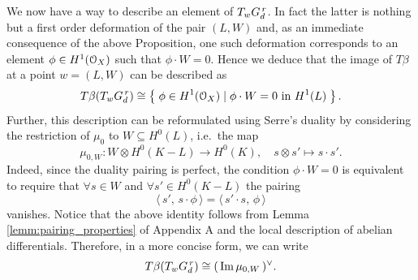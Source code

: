 	We now have a way to describe an element of $T_wG_d^{\,r}$. In fact the latter is nothing but a first order deformation of the pair $(L,W)$ and, as an immediate consequence of the above Proposition, one such deformation corresponds to an element $\phi\in H^1(\mathcal{O}_X)$ such that $\phi\cdot W = 0$. Hence we deduce that the image of $T\beta$ at a point $w=(L,W)$ can be described as
	\begin{equation*}
		T\beta(T_w G_d^{\,r}) \cong \left\{\;  \phi \in H^1(\mathcal{O}_X) \mid \phi\cdot W = 0 \text{ in } H^1(L)  \; \right\}.
	\end{equation*}
	Further, this description can be reformulated using Serre's duality by considering the restriction of $\mu_0$ to $W\subseteq H^0(L)$, i.e.\ the map
	$$ \mu_{0,W} : W\otimes H^0(K-L) \to H^0(K), \quad s\otimes s' \mapsto s\cdot s'. $$
	Indeed, since the duality pairing is perfect, the condition $\phi\cdot W = 0$ is equivalent to require that $\forall s\in W$ and $\forall s'\in H^0(K-L)$ the pairing
	$$ \langle\, s',\, s\cdot \phi \, \rangle = \langle \,s'\cdot s,\, \phi \,\rangle $$
	vanishes. Notice that the above identity follows from Lemma \ref{lemm:pairing_properties} of Appendix A and the local description of abelian differentials. Therefore, in a more concise form, we can write 
	\begin{equation}\label{eq:im_beta_*}
		T\beta(T_w G_d^{\,r})\cong(\,\operatorname{Im} \mu_{0,W}\,)^{\vee}.
	\end{equation}

